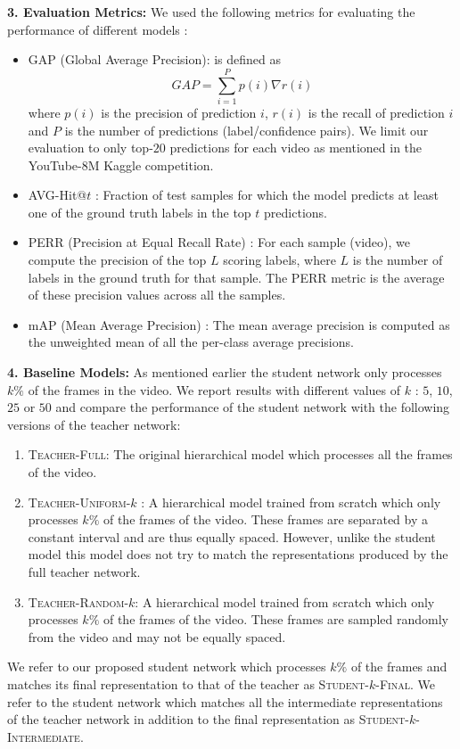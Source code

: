 \documentclass[10pt,twocolumn,letterpaper]{article}
\newcommand{\full}{\textsc{Teacher-Full}}
\newcommand{\uniform}[1]{\textsc{Teacher-Uniform-}$#1$}
\newcommand{\random}[1]{\textsc{Teacher-Random-}$#1$}
\newcommand{\final}[1]{\textsc{Student-}$#1$\textsc{-Final}}
\newcommand{\inter}[1]{\textsc{Student-}$#1$\textsc{-Intermediate}}
\begin{document}
\noindent \textbf{3. Evaluation Metrics:} We used the following metrics for evaluating the performance of different models \cite{Youtube8M}:
\begin{itemize}[leftmargin=*,noitemsep]
\item GAP (Global Average Precision): is defined as
\[GAP = \sum_{i=1}^{P} p(i) \nabla r(i)\]
where $p(i)$ is the precision of prediction $i$, $r(i)$ is the
recall of prediction $i$ and $P$ is the number of predictions
(label/confidence pairs). We limit our evaluation to only top-$20$ predictions for each video as mentioned in the YouTube-8M
Kaggle competition.
\item AVG-Hit@$t$ : Fraction of test samples for which the model predicts at least
one of the ground truth labels in the top $t$ predictions. 
\item PERR (Precision at Equal Recall Rate) : For each sample (video), we compute the precision of the top $L$ scoring labels, where $L$ is the number of labels in the ground truth for that sample. The PERR metric is the average of these precision values across all the samples.  
\item mAP (Mean Average Precision) : The mean average precision is computed
as the unweighted mean of all the per-class average precisions.
\end{itemize}
\noindent \textbf{4. Baseline Models:} As mentioned earlier the student network only processes $k\%$ of the frames in the video. We report results with different values of $k$ : $5$, $10$, $25$ or $50$ and compare the performance of the student network with the following versions of the teacher network:
\begin{enumerate}[leftmargin=*,label=\alph*)]
\item \full: The original hierarchical model which processes all the frames of the video.
\item \uniform{k} : A hierarchical model trained from scratch which only processes $k\%$ of the frames of the video. These frames are separated by a constant interval and are thus equally spaced. However, unlike the student model this model does not try to match the representations produced by the full teacher network. 
\item \random{k}:  A hierarchical model trained from scratch which only processes $k\%$ of the frames of the video. These frames are sampled randomly from the video and may not be equally spaced.
\end{enumerate}

We refer to our proposed student network which processes $k\%$ of the frames and matches its final representation to that of the teacher as \final{k}. We refer to the student network which matches all the intermediate representations of the teacher network in addition to the final representation as  \inter{k}.
\end{document}
